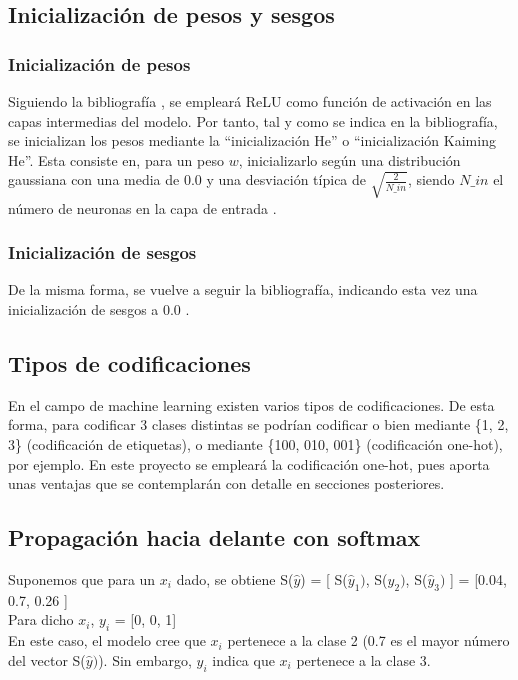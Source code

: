 \subsection{Inicialización de pesos y sesgos}

\subsubsection{Inicialización de pesos}
Siguiendo la bibliografía \cite{importancia_ReLU} \cite{importancia_ReLU_2}, se empleará ReLU como función de activación en las capas intermedias del modelo. Por tanto, tal y como se indica en la bibliografía, se inicializan los pesos mediante la ``inicialización He'' o ``inicialización Kaiming He''. Esta consiste en, para un peso $w$, inicializarlo según una distribución gaussiana con una media de 0.0 y una desviación típica de $\sqrt{\frac{2}{N\_in}}$, siendo $N\_in$ el número de neuronas en la capa de entrada
 \cite{ini_He} \cite{ini_He_2} \cite{ini_He_code}.

\subsubsection{Inicialización de sesgos}

De la misma forma, se vuelve a seguir la bibliografía, indicando esta vez una inicialización de sesgos a 0.0 \cite{ini_bias} \cite{ini_bias_2}.

\subsection{Tipos de codificaciones}

En el campo de machine learning existen varios tipos de codificaciones. De esta forma, para codificar 3 clases distintas se podrían codificar o bien mediante \{1, 2, 3\} (codificación de etiquetas), o mediante \{100, 010, 001\} (codificación one-hot), por ejemplo. En este proyecto se empleará la codificación one-hot, pues aporta unas ventajas que se contemplarán con detalle en secciones posteriores.

\subsection{Propagación hacia delante con softmax}

Suponemos que para un $x_i$ dado, se obtiene S($\hat{y}$) = [ S($\hat{y}_1)$, S($\hat{y}_2)$, S($\hat{y}_3)$ ] = [0.04, 0.7, 0.26 ] \\
Para dicho $x_i$, $y_i$ = [0, 0, 1] \\
En este caso, el modelo cree que $x_i$ pertenece a la clase 2 (0.7 es el mayor número del vector S($\hat{y})$). Sin embargo, $y_i$ indica que $x_i$ pertenece a la clase 3. \\


